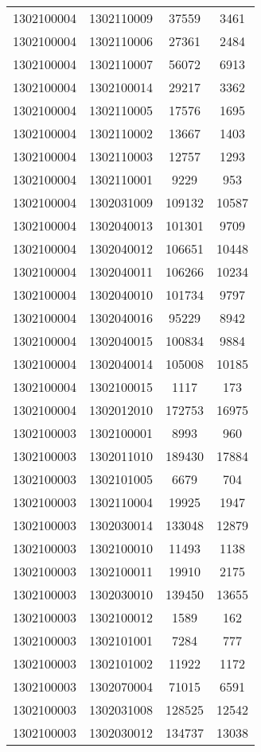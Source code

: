 \begin{longtable}[h]{llcc}
		1302100004 & 1302110009 & 37559 & 3461\\
		1302100004 & 1302110006 & 27361 & 2484\\
		1302100004 & 1302110007 & 56072 & 6913\\
		1302100004 & 1302100014 & 29217 & 3362\\
		1302100004 & 1302110005 & 17576 & 1695\\
		1302100004 & 1302110002 & 13667 & 1403\\
		1302100004 & 1302110003 & 12757 & 1293\\
		1302100004 & 1302110001 & 9229 & 953\\
		1302100004 & 1302031009 & 109132 & 10587\\
		1302100004 & 1302040013 & 101301 & 9709\\
		1302100004 & 1302040012 & 106651 & 10448\\
		1302100004 & 1302040011 & 106266 & 10234\\
		1302100004 & 1302040010 & 101734 & 9797\\
		1302100004 & 1302040016 & 95229 & 8942\\
		1302100004 & 1302040015 & 100834 & 9884\\
		1302100004 & 1302040014 & 105008 & 10185\\
		1302100004 & 1302100015 & 1117 & 173\\
		1302100004 & 1302012010 & 172753 & 16975\\
		1302100003 & 1302100001 & 8993 & 960\\
		1302100003 & 1302011010 & 189430 & 17884\\
		1302100003 & 1302101005 & 6679 & 704\\
		1302100003 & 1302110004 & 19925 & 1947\\
		1302100003 & 1302030014 & 133048 & 12879\\
		1302100003 & 1302100010 & 11493 & 1138\\
		1302100003 & 1302100011 & 19910 & 2175\\
		1302100003 & 1302030010 & 139450 & 13655\\
		1302100003 & 1302100012 & 1589 & 162\\
		1302100003 & 1302101001 & 7284 & 777\\
		1302100003 & 1302101002 & 11922 & 1172\\
		1302100003 & 1302070004 & 71015 & 6591\\
		1302100003 & 1302031008 & 128525 & 12542\\
		1302100003 & 1302030012 & 134737 & 13038\\

\end{longtable}
